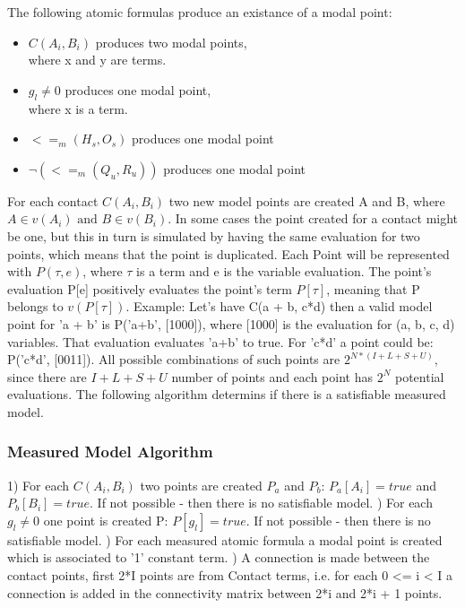 \documentclass{article}
\begin{document}
		The following atomic formulas produce an existance of a modal point:
		\begin{itemize}
			\item $C(A_i, B_i)$ produces two modal points, \\
				where x and y are terms.
			\item $g_l \neq 0$ produces one modal point, \\
				where x is a term.
			\item $<=_m(H_s, O_s)$ produces one modal point
			\item $\neg (<=_m(Q_u, R_u) )$ produces one modal point
		\end{itemize}
		For each contact $C(A_i, B_i)$ two new model points are created A and B, where $A \in v(A_i) \text{ and } B \in v(B_i)$.
		In some cases the point created for a contact might be one, but this in turn is simulated by having the same evaluation for two 
		points, which means that the point is duplicated.
		\newline
		Each Point will be represented with $P(\tau , e)$, where $\tau$ is a term and e is the variable evaluation.
		The point's evaluation P[e] positively evaluates the point's term $P[\tau ]$, meaning that P belongs to $v(P[\tau ])$.
		\newline
		Example: Let's have C(a + b, c*d)
		\newline
		then a valid model point for 'a + b' is P('a+b', [1000]), where [1000] is the evaluation for (a, b, c, d) variables.
		That evaluation evaluates 'a+b' to true.
		\newline
		For 'c*d' a point could be: P('c*d', [0011]).
		\newline
		All possible combinations of such points are $2^{N * (I + L + S + U)}$, since there are $I + L + S + U$ number of points and 
		each point has $2^N$ potential evaluations.
		\newline
		The following algorithm determins if there is a satisfiable measured model.

		\subsubsection*{Measured Model Algorithm}

			1)  For each $C(A_i, B_i)$ two points are created $P_a$ and $P_b$: $P_a[A_i] = true$ and $P_b[B_i] = true$.
				If not possible - then there is no satisfiable model.
			\newline
			) For each $g_l \neq 0$ one point is created P: $P[g_l] = true$.
				If not possible - then there is no satisfiable model.
			\newline
			) For each measured atomic formula a modal point is created which is associated to '1' constant term.
			\newline
			) A connection is made between the contact points, first 2*I points are from Contact terms,
				 i.e. for each 0 <= i < I a connection is added in the connectivity matrix between 2*i and 2*i + 1 points. %
			\newline
			
\end{document}
